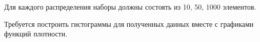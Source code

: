 Для каждого распределения наборы должны состоять из 10, 50, 1000 элементов. 

Требуется построить гистограммы для полученных данных вместе с графиками функций плотности.

